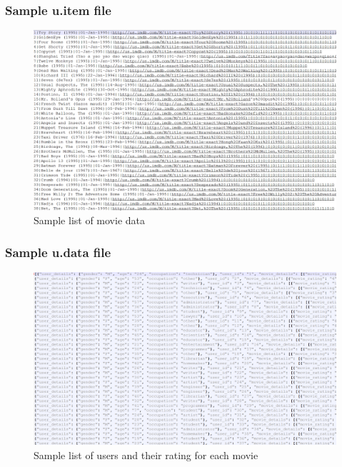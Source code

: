 \subsubsection{Sample u.item file}
\begin{figure}[ht]    
    \begin{center}
        \includegraphics[scale=0.4]{sample_uitem.png}
        \caption{Sample list of movie data}
        \label{Samplelist2}
    \end{center}
\end{figure}
\newpage

\subsubsection{Sample u.data file}
\begin{figure}[ht]    
    \begin{center}
        \includegraphics[scale=0.4]{sample_udata.png}
        \caption{Sample list of users and their rating for each movie}
        \label{Samplelist3}
    \end{center}
\end{figure}
\newpage
